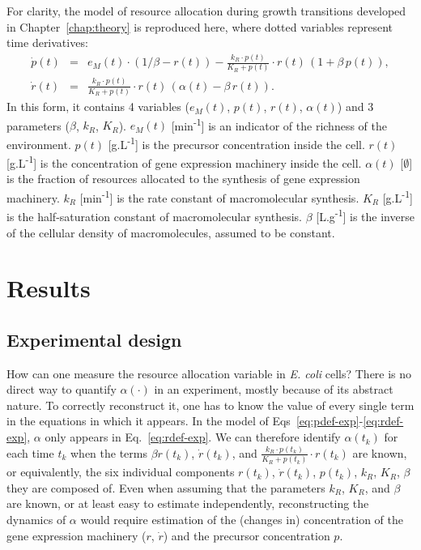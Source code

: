 For clarity, the model of resource allocation during growth transitions developed in Chapter~\ref{chap:theory} is reproduced here, where dotted variables represent time derivatives:
\begin{eqnarray}
\dot{p}(t) &=& e_M(t)\cdot (1/\beta - r(t)) - \frac{k_R \cdot p(t)}{K_R + p(t)}\cdot r(t) \, (1+\beta\, p(t)), \label{eq:pdef-exp}\\
\dot{r}(t) &=& \frac{k_R \cdot p(t)}{K_R + p(t)}\cdot r(t) \, (\alpha(t) - \beta\, r(t)). \label{eq:rdef-exp}
\end{eqnarray}
In this form, it contains 4 variables ($e_M(t)$, $p(t)$, $r(t)$, $\alpha (t)$) and 3 parameters ($\beta$, $k_R$, $K_R$).
$e_M(t)$ [min\textsuperscript{-1}] is an indicator of the richness of the environment.
$p(t)$ [g.L\textsuperscript{-1}] is the precursor concentration inside the cell.
$r(t)$ [g.L\textsuperscript{-1}] is the concentration of gene expression machinery inside the cell.
$\alpha (t)$ [$\emptyset$] is the fraction of resources allocated to the synthesis of gene expression machinery.
$k_R$ [min\textsuperscript{-1}] is the rate constant of macromolecular synthesis.
$K_R$ [g.L\textsuperscript{-1}] is the half-saturation constant of macromolecular synthesis.
$\beta$ [L.g\textsuperscript{-1}] is the inverse of the cellular density of macromolecules, assumed to be constant.



\section{Results}

\subsection{Experimental design}
\label{sec:exp_design}

How can one measure the resource allocation variable in \textit{E. coli} cells?
There is no direct way to quantify $\alpha (\cdot)$ in an experiment, mostly because of its abstract nature.
To correctly reconstruct it, one has to know the value of every single term in the equations in which it appears.
In the model of Eqs~\ref{eq:pdef-exp}-\ref{eq:rdef-exp}, $\alpha$ only appears in Eq.~\ref{eq:rdef-exp}.
We can therefore identify $\alpha (t_k)$ for each time $t_k$ when the terms $\beta r(t_k)$, $\dot{r}(t_k)$, and $\frac{k_R \cdot p(t_k)}{K_R + p(t_k)} \cdot r(t_k)$ are known, or equivalently, the six individual components $r(t_k)$, $\dot{r}(t_k)$, $p(t_k)$, $k_R$, $K_R$, $\beta$ they are composed of.
Even when assuming that the parameters $k_R$, $K_R$, and $\beta$ are known, or at least easy to estimate independently, reconstructing the dynamics of $\alpha$ would require estimation of the (changes in) concentration of the gene expression machinery ($r$, $\dot{r}$) and the precursor concentration $p$.

